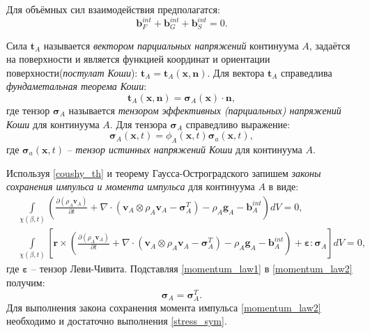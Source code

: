 	Для объёмных сил взаимодействия предполагатся:
\begin{equation}
	\label{force_int}
	\boldsymbol{b}_F^{int} + \boldsymbol{b}_G^{int} + \boldsymbol{b}_S^{int} = 0.
\end{equation}
	
	Сила $\boldsymbol{t}_A$ называется \textit{вектором парциальных напряжений} континуума $A$, задаётся на поверхности и является функцией координат и ориентации поверхности(\textit{постулат Коши}): $\boldsymbol{t}_A = \boldsymbol{t}_A(\boldsymbol{x}, \boldsymbol{n})$. Для вектора $\boldsymbol{t}_A$ справедлива \textit{фундаметальная теорема Коши}:
\begin{equation}
	\label{coushy_th}
	\boldsymbol{t}_A(\boldsymbol{x}, \boldsymbol{n}) = \boldsymbol{\sigma}_A(\boldsymbol{x}) \cdot \boldsymbol{n}, 
\end{equation}
	где тензор $\boldsymbol{\sigma}_A$ называется \textit{тензором эффективных (парциальных) напряжений Коши} для континуума $A$. Для тензора $\boldsymbol{\sigma}_A$ справедливо выражение:
\begin{equation}
	\label{stress_tensor}
	\boldsymbol{\sigma}_A(\boldsymbol{x}, t) = \phi_A(\boldsymbol{x}, t) \boldsymbol{\sigma}_a(\boldsymbol{x}, t),
\end{equation}
	где $\boldsymbol{\sigma}_a(\boldsymbol{x}, t)$ -- \textit{тензор истинных напряжений Коши} для континуума $A$.

	Используя \eqref{coushy_th} и теорему Гаусса-Остроградского запишем \textit{законы сохранения импульса и момента импульса} для континуума $A$ в виде:
\begin{align}
	\label{momentum_law1}
	&\int\limits_{\chi(\beta, t)} \left( \frac{\partial (\rho_A \boldsymbol{v}_A)}{\partial t} 
	+ \nabla \cdot \left( \boldsymbol{v}_A \otimes \rho_A\boldsymbol{v}_A - \boldsymbol{\sigma}^T_A \right) - \rho_A \boldsymbol{g}_A - \boldsymbol{b}_A^{int} \right) dV = 0,\\
	\label{momentum_law2}
	&\int\limits_{\chi(\beta, t)} \left[ \boldsymbol{r} \times \left( \frac{\partial (\rho_A \boldsymbol{v}_A)}{\partial t} 
	+ \nabla \cdot \left( \boldsymbol{v}_A \otimes \rho_A\boldsymbol{v}_A - \boldsymbol{\sigma}^T_A \right) - \rho_A \boldsymbol{g}_A - \boldsymbol{b}_A^{int} \right) + \boldsymbol{\varepsilon} : \boldsymbol{\sigma}_A \right] dV = 0,
\end{align}
	где $\boldsymbol{\varepsilon}$ -- тензор Леви-Чивита. Подставляя \eqref{momentum_law1} в \eqref{momentum_law2} получим:
\begin{equation}
	\label{stress_sym}
	\boldsymbol{\sigma}_A = \boldsymbol{\sigma}_A^T.
\end{equation}
	Для выполнения закона сохранения момента импульса \eqref{momentum_law2} необходимо и достаточно выполнения \eqref{stress_sym}.
	
